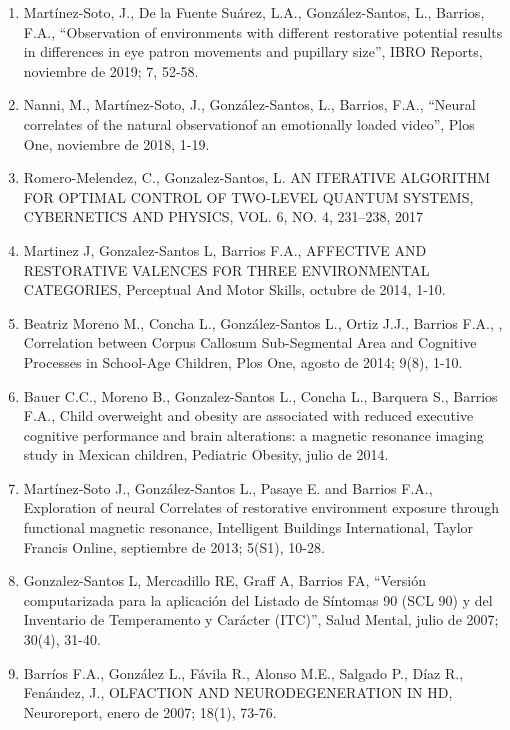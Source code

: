 \begin{enumerate}
\item Martínez-Soto, J., De la Fuente Suárez, L.A., González-Santos, L., Barrios, F.A., “Observation of 
environments 
with different restorative potential results in differences in eye patron movements and pupillary size”, IBRO 
Reports, noviembre de 2019; 7, 52-58.

\item Nanni, M., Martínez-Soto, J., González-Santos, L., Barrios, F.A., “Neural correlates of the natural 
observationof an emotionally loaded video”, Plos One, noviembre de 2018, 1-19.

\item Romero-Melendez, C., Gonzalez-Santos, L. AN ITERATIVE ALGORITHM FOR OPTIMAL CONTROL OF TWO-LEVEL QUANTUM 
SYSTEMS, CYBERNETICS AND PHYSICS, VOL. 6, NO. 4, 231–238, 2017

\item Martinez J, Gonzalez-Santos L, Barrios F.A., AFFECTIVE AND RESTORATIVE VALENCES FOR THREE ENVIRONMENTAL 
CATEGORIES, Perceptual And Motor Skills, octubre de 2014, 1-10.

\item Beatriz Moreno M., Concha L., González-Santos L., Ortiz J.J., Barrios F.A., , Correlation between Corpus 
Callosum Sub-Segmental Area and Cognitive Processes in School-Age Children, Plos One, agosto de 2014; 9(8), 
1-10.

\item Bauer C.C., Moreno B., Gonzalez-Santos L., Concha L., Barquera S., Barrios F.A., Child overweight and 
obesity 
are associated with reduced executive cognitive performance and brain alterations: a magnetic resonance 
imaging study in Mexican children, Pediatric Obesity, julio de 2014.

\item Martínez-Soto J., González-Santos L., Pasaye E. and Barrios F.A., Exploration of neural Correlates of 
restorative environment exposure through functional magnetic resonance, Intelligent Buildings International, 
Taylor Francis Online, septiembre de 2013; 5(S1), 10-28.

\item Gonzalez-Santos L, Mercadillo RE, Graff A, Barrios FA, “Versión computarizada para la aplicación del 
Listado 
de Síntomas 90 (SCL 90) y del Inventario de Temperamento y Carácter (ITC)”, Salud Mental, julio de 2007; 
30(4), 31-40.

\item Barríos F.A., González L., Fávila R., Alonso M.E., Salgado P., Díaz R., Fenández, J., OLFACTION AND 
NEURODEGENERATION IN HD, Neuroreport, enero de 2007; 18(1), 73-76.


\end{enumerate}
